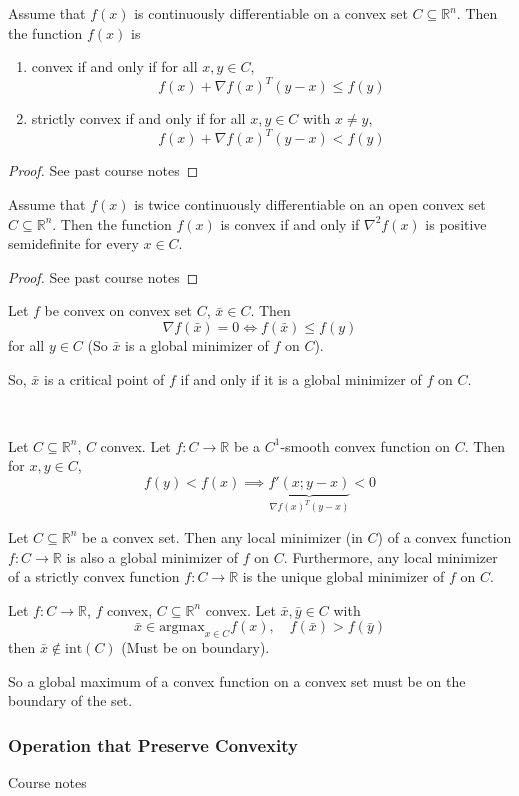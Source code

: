 \begin{theorem} \label{thm:first-order-convex}
    Assume that $f(x)$ is continuously differentiable on a convex set $C \subseteq \mathbb R^n$. Then the function $f(x)$ is
    \begin{enumerate}
        \item convex if and only if for all $x, y \in C$, $$f(x) + \nabla f(x)^T (y - x) \leq f(y)$$
        \item strictly convex if and only if for all $x, y \in C$ with $x \neq y$,
        $$f(x) + \nabla f(x)^T (y - x) < f(y)$$
    \end{enumerate}
\end{theorem}
\begin{proof}[Proof]
    See past course notes
\end{proof}
\begin{theorem} \label{thm:second-order-convex}
    Assume that $f(x)$ is twice continuously differentiable on an open convex set $C \subseteq \mathbb R^n$. Then the function $f(x)$ is convex if and only if $\nabla^2 f(x)$ is positive semidefinite for every $x \in C$.
\end{theorem}
\begin{proof}[Proof]
    See past course notes
\end{proof}
\begin{corollary}
    Let $f$ be convex on convex set $C$, $\bar x \in C$. Then $$\nabla f(\bar x) = 0 \iff f(\bar x) \leq f(y)$$ for all $y \in C$ (So $\bar x$ is a global minimizer of $f$ on $C$).

    So, $\bar x$ is a critical point of $f$ if and only if it is a global minimizer of $f$ on $C$.
\end{corollary}\
\begin{lemma}
    Let $C \subseteq \mathbb R^n$, $C$ convex. Let $f: C \to \mathbb R$ be a $C^1$-smooth convex function on $C$. Then for $x,y \in C$, $$f(y) < f(x) \implies \underbrace{f'(x; y - x)}_{\nabla f(x)^T (y - x)} < 0$$
\end{lemma}
\begin{theorem}[]
    Let $C \subseteq \mathbb R^n$ be a convex set. Then any local minimizer (in $C$) of a convex function $f: C \to \mathbb R$ is also a global minimizer of $f$ on $C$. Furthermore, any local minimizer of a strictly convex function $f: C \to \mathbb R$ is the unique global minimizer of $f$ on $C$.
\end{theorem}
\begin{lemma}
    Let $f: C \to \mathbb R$, $f$ convex, $C\subseteq \mathbb R^n$ convex. Let $\bar x, \bar y \in C$ with $$\bar x \in \text{argmax}_{x \in C}f(x), \quad f(\bar x) > f(\bar y)$$ then $\bar x \not \in \text{int}(C)$ (Must be on boundary).

    So a global maximum of a convex function on a convex set must be on the boundary of the set.
\end{lemma}
\subsubsection{Operation that Preserve Convexity}
Course notes
